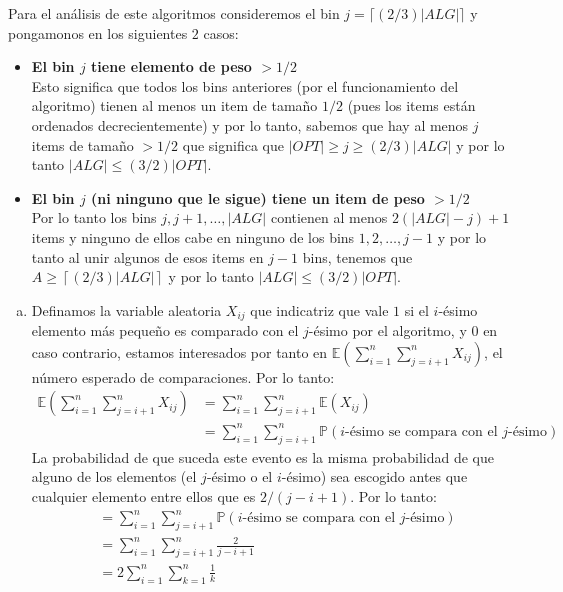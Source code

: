 \documentclass[dcc,uchile]{fcfmcourse}
\theoremstyle{plain}
\theoremstyle{definition}
\begin{document}
\begin{problems}
\begin{enumerate}[a)]
Para el análisis de este algoritmos consideremos el bin $j = \lceil (2/3)|ALG| \rceil$ y pongamonos en los siguientes $2$ casos:
\begin{itemize}
\item \textbf{El bin $j$ tiene elemento de peso $>1/2$}\\
Esto significa que todos los bins anteriores (por el funcionamiento del algoritmo) tienen al menos un item de tamaño $1/2$ (pues los items están ordenados decrecientemente) y por lo tanto, sabemos que hay al menos $j$ items de tamaño $>1/2$ que significa que $|OPT|\ge j \ge (2/3)|ALG|$ y por lo tanto $|ALG| \le (3/2)|OPT|$.
\item \textbf{El bin $j$ (ni ninguno que le sigue) tiene un item de peso $>1/2$}\\
Por lo tanto los bins $j, j+1, \ldots, |ALG|$ contienen al menos $2(|ALG|-j) + 1$ items y ninguno de ellos cabe en ninguno de los bins $1, 2, \ldots, j-1$ y por lo tanto al unir algunos de esos items en $j-1$ bins, tenemos que  $A \ge \left\lceil(2/3)|ALG|\right\rceil$  y por lo tanto $|ALG| \le (3/2)|OPT|$.
\end{itemize}
\end{enumerate}
\problem 
\begin{enumerate}[a)]
    \item Definamos la variable aleatoria $X_{ij}$ que indicatriz que vale $1$ si el $i$-ésimo elemento más pequeño es comparado con el $j$-ésimo por el algoritmo, y $0$ en caso contrario, estamos interesados por tanto en $\mathbb{E}\left(\sum_{i=1}^{n}\sum_{j=i+1}^{n}X_{ij}\right)$, el número esperado de comparaciones. Por lo tanto:
    \begin{align*}
    \mathbb{E}\left(\sum_{i=1}^{n}\sum_{j=i+1}^{n}X_{ij}\right) &= \sum_{i=1}^{n}\sum_{j=i+1}^{n}\mathbb{E}(X_{ij})\\
    &= \sum_{i=1}^{n}\sum_{j=i+1}^{n} \mathbb{P}(\text{$i$-ésimo se compara con el $j$-ésimo})
    \end{align*}
    La probabilidad de que suceda este evento es la misma probabilidad de que alguno de los elementos (el $j$-ésimo o el $i$-ésimo) sea escogido antes que cualquier elemento entre ellos que es $2/(j-i+1)$. Por lo tanto:
    \begin{align*}
        &= \sum_{i=1}^{n}\sum_{j=i+1}^{n} \mathbb{P}(\text{$i$-ésimo se compara con el $j$-ésimo}) \\
        &= \sum_{i=1}^{n}\sum_{j=i+1}^{n} \frac{2}{j-i+1}\\
        &= 2\sum_{i=1}^{n}\sum_{k=1}^{n}\frac{1}{k}\\

\end{align*}
\end{enumerate}
\end{problems}
\end{document}

